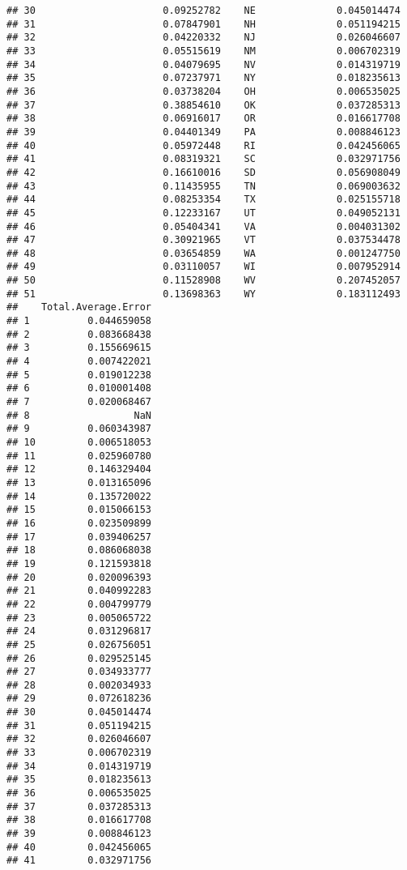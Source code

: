 \documentclass{article}\usepackage[]{graphicx}\usepackage[]{color}
\makeatletter
\newenvironment{kframe}{%
 \def\at@end@of@kframe{}%
 \ifinner\ifhmode%
  \def\at@end@of@kframe{\end{minipage}}%
  \begin{minipage}{\columnwidth}%
 \fi\fi%
 \def\FrameCommand##1{\hskip\@totalleftmargin \hskip-\fboxsep
 \colorbox{shadecolor}{##1}\hskip-\fboxsep
     \hskip-\linewidth \hskip-\@totalleftmargin \hskip\columnwidth}%
 \MakeFramed {\advance\hsize-\width
   \@totalleftmargin\z@ \linewidth\hsize
   \@setminipage}}%
 {\par\unskip\endMakeFramed%
 \at@end@of@kframe}
\newenvironment{knitrout}{}{} %
\makeatother
\begin{document}
\begin{knitrout}
\begin{kframe}
\begin{verbatim}
## 30                      0.09252782    NE              0.045014474
## 31                      0.07847901    NH              0.051194215
## 32                      0.04220332    NJ              0.026046607
## 33                      0.05515619    NM              0.006702319
## 34                      0.04079695    NV              0.014319719
## 35                      0.07237971    NY              0.018235613
## 36                      0.03738204    OH              0.006535025
## 37                      0.38854610    OK              0.037285313
## 38                      0.06916017    OR              0.016617708
## 39                      0.04401349    PA              0.008846123
## 40                      0.05972448    RI              0.042456065
## 41                      0.08319321    SC              0.032971756
## 42                      0.16610016    SD              0.056908049
## 43                      0.11435955    TN              0.069003632
## 44                      0.08253354    TX              0.025155718
## 45                      0.12233167    UT              0.049052131
## 46                      0.05404341    VA              0.004031302
## 47                      0.30921965    VT              0.037534478
## 48                      0.03654859    WA              0.001247750
## 49                      0.03110057    WI              0.007952914
## 50                      0.11528908    WV              0.207452057
## 51                      0.13698363    WY              0.183112493
##    Total.Average.Error
## 1          0.044659058
## 2          0.083668438
## 3          0.155669615
## 4          0.007422021
## 5          0.019012238
## 6          0.010001408
## 7          0.020068467
## 8                  NaN
## 9          0.060343987
## 10         0.006518053
## 11         0.025960780
## 12         0.146329404
## 13         0.013165096
## 14         0.135720022
## 15         0.015066153
## 16         0.023509899
## 17         0.039406257
## 18         0.086068038
## 19         0.121593818
## 20         0.020096393
## 21         0.040992283
## 22         0.004799779
## 23         0.005065722
## 24         0.031296817
## 25         0.026756051
## 26         0.029525145
## 27         0.034933777
## 28         0.002034933
## 29         0.072618236
## 30         0.045014474
## 31         0.051194215
## 32         0.026046607
## 33         0.006702319
## 34         0.014319719
## 35         0.018235613
## 36         0.006535025
## 37         0.037285313
## 38         0.016617708
## 39         0.008846123
## 40         0.042456065
## 41         0.032971756

\end{verbatim}
\end{kframe}
\end{knitrout}
\end{document}

